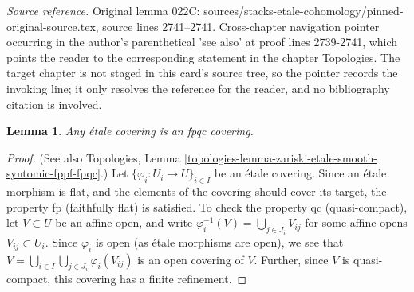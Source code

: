 \documentclass[10pt,a4paper]{amsart}
\theoremstyle{plain}
\newtheorem{lemma}[subsection]{Lemma}
\theoremstyle{definition}
\theoremstyle{remark}
\numberwithin{equation}{subsection}
\begin{document}
\noindent\textit{Source reference.} Original lemma 022C: sources/stacks-etale-cohomology/pinned-original-source.tex, source lines 2741--2741. Cross-chapter navigation pointer occurring in the author's parenthetical 'see also' at proof lines 2739-2741, which points the reader to the corresponding statement in the chapter Topologies. The target chapter is not staged in this card's source tree, so the pointer records the invoking line; it only resolves the reference for the reader, and no bibliography citation is involved.\par\medskip
\begin{lemma}
\label{lemma-etale-fpqc}
Any \'etale covering is an fpqc covering.
\end{lemma}

\begin{proof}
(See also
Topologies,
Lemma \ref{topologies-lemma-zariski-etale-smooth-syntomic-fppf-fpqc}.)
Let $\{\varphi_i : U_i \to U\}_{i \in I}$ be an \'etale covering.
Since an \'etale morphism is flat, and the elements of the covering should
cover its target, the property fp (faithfully flat) is satisfied.
To check the property qc (quasi-compact), let $V \subset U$ be an affine
open, and write $\varphi_i^{-1}(V) = \bigcup_{j \in J_i} V_{ij}$
for some affine opens $V_{ij} \subset U_i$. Since $\varphi_i$ is open
(as \'etale morphisms are open), we see that
$V = \bigcup_{i\in I} \bigcup_{j \in J_i} \varphi_i(V_{ij})$
is an open covering of $V$.
Further, since $V$ is quasi-compact, this covering has a finite
refinement.
\end{proof}
\end{document}
